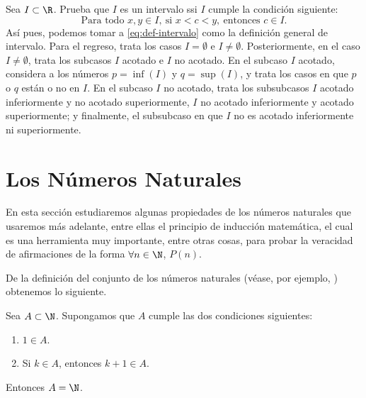 \documentclass[12pt,a4paper]{book}
\begin{document}
    \begin{ejercicio}[Intervalos]\label{ej:49}
        Sea $I\subset\R$. Prueba que $I$ es un intervalo ssi $I$
        cumple la condición siguiente:
        \begin{equation}\label{eq:def-intervalo}
            \text{Para todo }x,y\in I,\ \text{si }x<c<y,\ \text{entonces }c\in I.
        \end{equation}
        Así pues, podemos tomar a \eqref{eq:def-intervalo} como la definición general de intervalo.
        \sugerencia Para el regreso, trata los casos $I=\emptyset$ e $I\neq\emptyset$. Posteriormente, en
        el caso $I\neq\emptyset$, trata los subcasos $I$ acotado e $I$ no acotado. En el subcaso $I$
        acotado, considera a los números $p=\inf(I)$ y $q=\sup(I)$, y trata los casos
        en que $p$ o $q$ están o no en $I$. En el subcaso $I$ no acotado, trata los
        subsubcasos $I$ acotado inferiormente y no acotado superiormente, $I$ no acotado
        inferiormente y acotado superiormente; y finalmente, el subsubcaso en que $I$
        no es acotado inferiormente ni superiormente.
    \end{ejercicio}

    \section{Los Números Naturales}\label{sec:naturales}

    En esta sección estudiaremos algunas propiedades de los números naturales
    que usaremos más adelante, entre ellas el principio de inducción matemática,
    el cual es una herramienta muy importante, entre otras cosas, para probar la
    veracidad de afirmaciones de la forma $\forall n\in\N$, $P(n)$.

    De la definición del conjunto de los números naturales (véase, por ejemplo,
    \cite{nunez2020logica}) obtenemos lo siguiente.

    \begin{proposicion}\label{prop:15}
        Sea $A\subset\N$.
        Supongamos que $A$ cumple las dos condiciones siguientes:
        \begin{enumerate}[nosep]
            \item $1\in A$.
            \item Si $k\in A$, entonces $k+1\in A$.
        \end{enumerate}
        Entonces $A=\N$.
    \end{proposicion}
\end{document}
